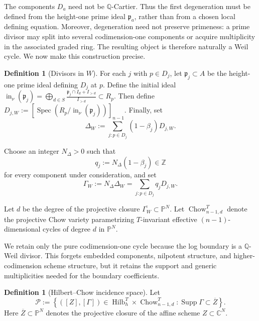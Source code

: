 \documentclass[11pt]{amsart}
\theoremstyle{definition}
\newtheorem{definition}[theorem]{Definition}
\theoremstyle{remark}
\begin{document}
The components $D_a$ need not be $\mathbb Q$-Cartier. Thus the first
degeneration must be defined from the height-one prime ideal
$\mathfrak p_a$, rather than from a chosen local defining equation.
Moreover, degeneration need not preserve primeness: a prime divisor may split
into several codimension-one components or acquire multiplicity in the
associated graded ring. The resulting object is therefore naturally a Weil
cycle. We now make this construction precise.



\begin{definition} [Divisors in $W$]
For each $j$ with $p\in D_j$, let $\mathfrak p_j\subset A$ be the height-one prime ideal defining $D_j$ at $p$. Define the initial ideal $\operatorname{in}_\nu(\mathfrak p_j)
        =
        \bigoplus_{d\in S}
        \frac{\mathfrak p_j\cap I_d+I_{>d}}{I_{>d}}
        \subset R_p.
$
Then define $D_{j,W}
        :=
        \left[
        \operatorname{Spec}
        \left(R_p/\operatorname{in}_\nu(\mathfrak p_j)\right)
        \right]_{n-1}.
$
Finally, set
\[
\Delta_W:=\sum_{j:p\in D_j}(1-\beta_j)D_{j,W}.
\]
\end{definition}

Choose an integer $N_\Delta>0$ such that
\[
q_j:=N_\Delta(1-\beta_j)\in\mathbb Z
\]
for every component under consideration, and set
\[
\Gamma_W:=N_\Delta\Delta_W
=
\sum_{j:p\in D_j}q_jD_{j,W}.
\]

Let $d$ be the degree of the projective closure $\overline{\Gamma_W}\subset
\mathbb P^N$. Let $\operatorname{Chow}_{n-1,d}^T$ denote the projective Chow variety parametrizing $T$-invariant effective $(n-1)$-dimensional cycles of
degree $d$ in $\mathbb P^N$.

We retain only the pure codimension-one cycle because the log boundary is a
$\mathbb{Q}$-Weil divisor. This forgets embedded components, nilpotent structure, and
higher-codimension scheme structure, but it retains the support and
generic multiplicities needed for the boundary coefficients.

\begin{definition}[Hilbert--Chow incidence space]
Let
\[
    \mathcal P
    :=
    \left\{
    ([Z],[\Gamma])\in
    \operatorname{Hilb}_h^T\times \operatorname{Chow}_{n-1,d}^T
    :
    \operatorname{Supp}\Gamma\subset \overline Z
    \right\}.
\]
Here $\overline Z\subset\mathbb P^N$ denotes the projective closure of the
affine scheme $Z\subset\mathbb C^N$.
\end{definition}
\end{document}
